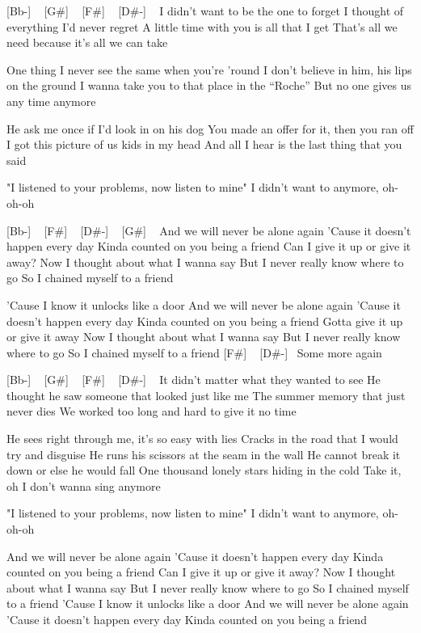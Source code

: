 [Bb-] ~ [G#] ~ [F#] ~ [D#-] ~
I didn't want to be the one to forget
I thought of everything I'd never regret
A little time with you is all that I get
That's all we need because it's all we can take

One thing I never see the same when you're 'round
I don’t believe in him, his lips on the ground
I wanna take you to that place in the “Roche”
But no one gives us any time anymore

He ask me once if I’d look in on his dog
You made an offer for it, then you ran off
I got this picture of us kids in my head
And all I hear is the last thing that you said

"I listened to your problems, now listen to mine"
I didn't want to anymore, oh-oh-oh

[Bb-] ~ [F#] ~ [D#-] ~ [G#] ~
And we will never be alone again
'Cause it doesn't happen every day
Kinda counted on you being a friend
Can I give it up or give it away?
Now I thought about what I wanna say
But I never really know where to go
So I chained myself to a friend

'Cause I know it unlocks like a door
And we will never be alone again
'Cause it doesn't happen every day
Kinda counted on you being a friend
Gotta give it up or give it away
Now I thought about what I wanna say
But I never really know where to go
So I chained myself to a friend
[F#] ~ [D#-]~
Some more again

[Bb-] ~ [G#] ~ [F#] ~ [D#-] ~
It didn't matter what they wanted to see
He thought he saw someone that looked just like me
The summer memory that just never dies
We worked too long and hard to give it no time

He sees right through me, it's so easy with lies
Cracks in the road that I would try and disguise
He runs his scissors at the seam in the wall
He cannot break it down or else he would fall
One thousand lonely stars hiding in the cold
Take it, oh I don't wanna sing anymore

"I listened to your problems, now listen to mine"
I didn't want to anymore, oh-oh-oh

And we will never be alone again
'Cause it doesn't happen every day
Kinda counted on you being a friend
Can I give it up or give it away?
Now I thought about what I wanna say
But I never really know where to go
So I chained myself to a friend
'Cause I know it unlocks like a door
And we will never be alone again
'Cause it doesn't happen every day
Kinda counted on you being a friend

